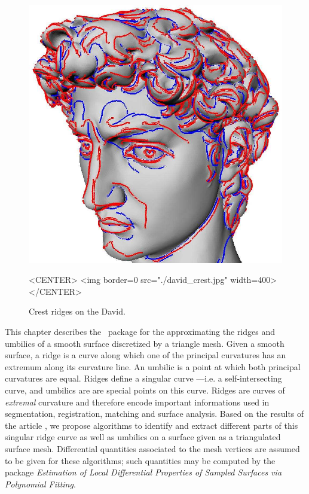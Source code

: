 
\newtheorem{definition}{Definition.}
\newcommand{\hot}{h.o.t}%


\begin{figure}[!ht]
\begin{ccTexOnly}
\centerline{
\includegraphics[width=.5\linewidth]{Ridges_3/david_crest}}
\end{ccTexOnly}

\label{david-crest}
\begin{ccHtmlOnly}
<CENTER> <img border=0 src="./david_crest.jpg" width=400>
</CENTER>
\end{ccHtmlOnly}
\caption{Crest ridges on the David.}
\end{figure}

This chapter describes the \cgal\ package for the approximating the
ridges and umbilics of a smooth surface discretized by a triangle
mesh.  Given a smooth surface, a ridge is a curve along which one of
the principal curvatures has an extremum along its curvature line. An
umbilic is a point at which both principal curvatures are
equal. Ridges define a singular curve ---i.e. a self-intersecting
curve, and umbilics are are special points on this curve. Ridges are
curves of {\em extremal} curvature and therefore encode important
informations used in segmentation, registration, matching and surface
analysis.  Based on the results of the article
\cite{cgal:cp-tdare-05}, we propose algorithms to identify and extract
different parts of this singular ridge curve as well as umbilics on a
surface given as a triangulated surface mesh. Differential quantities
associated to the mesh vertices are assumed to be given for these
algorithms; such quantities may be computed by the package {\em
Estimation of Local Differential Properties of Sampled Surfaces via
Polynomial Fitting}.

